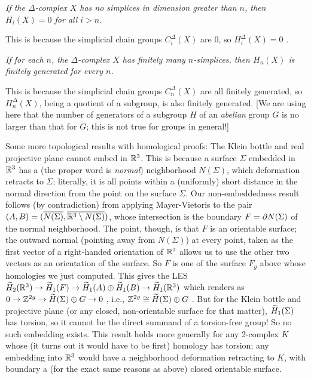 \ssk

{\it If the $\Delta$-complex $X$ has no simplices in dimension greater than $n$, then 
$H_i(X)=0$ for all $i>n$.}

\ssk

This is because the simplicial chain groups $C_i^\Delta(X)$ are $0$, so $H_i^\Delta(X)=0$ .

\ssk

{\it If for each $n$, the $\Delta$-complex $X$ has finitely many $n$-simplices, then 
$H_n(X)$ is finitely generated for every $n$.}

\ssk

This is because the simplicial chain groups $C_n^\Delta(X)$ are all finitely generated,
so $H_n^\Delta(X)$, being a quotient of a subgroup, is also finitely generated. [We
are using here that the number of generators of a subgroup $H$ of an {\it abelian} 
group $G$ is no larger than that for $G$; this is not true for groups in general!]


\bigskip

Some more topological results with homological proofs: The Klein bottle and real projective plane cannot 
embed in ${\Bbb R}^3$. This is because a surface $\Sigma$ embedded in ${\Bbb R}^3$ has a (the proper word is {\it normal})
neighborhood $N(\Sigma)$, which deformation retracts to $\Sigma$; literally, it is all points within a (uniformly) short distance
in the normal direction from the point on the surface $\Sigma$. Our non-embeddedness result follows (by contradiction)
from applying Mayer-Vietoris to the pair $(A,B) = (\overline{N(\Sigma)},\overline{{\Bbb R}^3\setminus N(\Sigma)})$, whose intersection
is the boundary $F=\partial N(\Sigma)$ of the normal neighborhood. The point, though, is that
$F$ is an orientable surface; the outward normal (pointing away from $N(\Sigma)$) at every point, taken as
the first vector of a right-handed orientation of ${\Bbb R}^3$ allows us to use the other two vectors as an 
orientation of the surface. So $F$ is one of the surface $F_g$ above whose homologies we just computed.
This gives the LES
\hhsk
$\widetilde{H}_2({\Bbb R}^3) \rightarrow \widetilde{H}_1(F) \rightarrow \widetilde{H}_1(A)\oplus \widetilde{H}_1(B)\rightarrow \widetilde{H}_1({\Bbb R} ^3)$
\hhsk 
which renders as 
\hhsk
$0\rightarrow{\Bbb Z}^{2g}\rightarrow \widetilde{H}(\Sigma)\oplus G\rightarrow 0$
\hhsk , i.e., \hhsk
${\Bbb Z}^{2g}\cong \widetilde{H}(\Sigma)\oplus G$ 
\hhsk . But for the Klein bottle and projective plane (or any closed, non-orientable
surface for that matter), $\widetilde{H}_1(\Sigma)$ has torsion, so it cannot be the direct
summand of a torsion-free group! So no such embedding exists. This result holds
more generally for any 2-complex $K$ whose (it turns out it would have to be first)
homology has torsion; any embedding into ${\Bbb R}^3$ would have a neighborhood 
deformation retracting to $K$, with boundary a (for the exact same reasons as above)
closed orientable surface.

